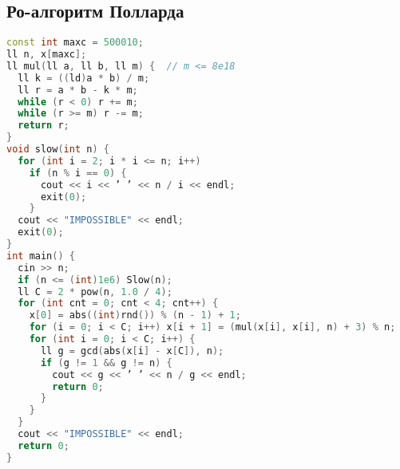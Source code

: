 \documentclass[10pt,a4paper,landscape,twosided]{extarticle}
\begin{document}
\begin{multicols}{3}
\subsection{Ро-алгоритм Полларда}
\begin{lstlisting}[language=C++]
const int maxc = 500010;
ll n, x[maxc];
ll mul(ll a, ll b, ll m) {  // m <= 8e18
  ll k = ((ld)a * b) / m;
  ll r = a * b - k * m;
  while (r < 0) r += m;
  while (r >= m) r -= m;
  return r;
}
void slow(int n) {
  for (int i = 2; i * i <= n; i++)
    if (n % i == 0) {
      cout << i << ’ ’ << n / i << endl;
      exit(0);
    }
  cout << "IMPOSSIBLE" << endl;
  exit(0);
}
int main() {
  cin >> n;
  if (n <= (int)1e6) Slow(n);
  ll C = 2 * pow(n, 1.0 / 4);
  for (int cnt = 0; cnt < 4; cnt++) {
    x[0] = abs((int)rnd()) % (n - 1) + 1;
    for (i = 0; i < C; i++) x[i + 1] = (mul(x[i], x[i], n) + 3) % n;
    for (int i = 0; i < C; i++) {
      ll g = gcd(abs(x[i] - x[C]), n);
      if (g != 1 && g != n) {
        cout << g << ’ ’ << n / g << endl;
        return 0;
      }
    }
  }
  cout << "IMPOSSIBLE" << endl;
  return 0;
}\end{lstlisting}
\end{multicols}
\end{document}
